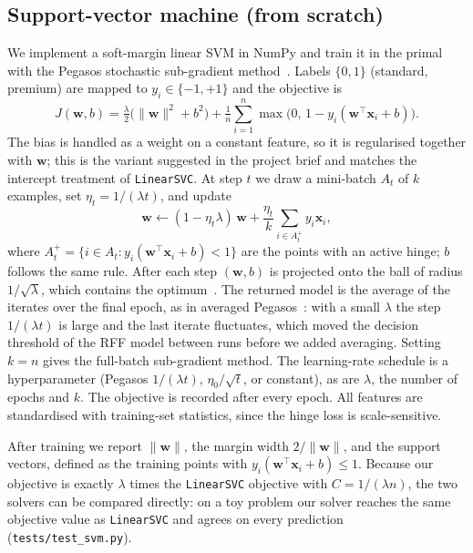 \subsection{Support-vector machine (from scratch)}
We implement a soft-margin linear SVM in NumPy and train it in the
primal with the Pegasos stochastic sub-gradient method~\cite{pegasos}.
Labels $\{0,1\}$ (standard, premium) are mapped to $y_i\in\{-1,+1\}$ and
the objective is
\begin{equation}
  J(\mathbf{w},b)=\tfrac{\lambda}{2}\big(\lVert\mathbf{w}\rVert^{2}+b^{2}\big)
  +\tfrac{1}{n}\sum_{i=1}^{n}\max\!\big(0,\,1-y_i(\mathbf{w}^{\top}\mathbf{x}_i+b)\big).
\end{equation}
The bias is handled as a weight on a constant feature, so it is
regularised together with $\mathbf{w}$; this is the variant suggested
in the project brief and matches the intercept treatment of
\texttt{LinearSVC}. At step $t$ we draw a mini-batch $A_t$ of $k$
examples, set $\eta_t=1/(\lambda t)$, and update
\begin{equation}
  \mathbf{w}\leftarrow(1-\eta_t\lambda)\,\mathbf{w}
  +\frac{\eta_t}{k}\sum_{i\in A_t^{+}}y_i\mathbf{x}_i ,
\end{equation}
where $A_t^{+}=\{i\in A_t: y_i(\mathbf{w}^{\top}\mathbf{x}_i+b)<1\}$ are
the points with an active hinge; $b$ follows the same rule. After each
step $(\mathbf{w},b)$ is projected onto the ball of radius
$1/\sqrt{\lambda}$, which contains the optimum~\cite{pegasos}. The
returned model is the average of the iterates over the final epoch, as in
averaged Pegasos~\cite{pegasos}: with a small $\lambda$ the step
$1/(\lambda t)$ is large and the last iterate fluctuates, which moved the
decision threshold of the RFF model between runs before we added
averaging. Setting
$k=n$ gives the full-batch sub-gradient method. The learning-rate
schedule is a hyperparameter (Pegasos $1/(\lambda t)$, $\eta_0/\sqrt{t}$,
or constant), as are $\lambda$, the number of epochs and $k$. The
objective is recorded after every epoch. All features are standardised
with training-set statistics, since the hinge loss is scale-sensitive.

After training we report $\lVert\mathbf{w}\rVert$, the margin width
$2/\lVert\mathbf{w}\rVert$, and the support vectors, defined as the
training points with $y_i(\mathbf{w}^{\top}\mathbf{x}_i+b)\le 1$.
Because our objective is exactly $\lambda$ times the
\texttt{LinearSVC} objective with $C=1/(\lambda n)$, the two solvers can
be compared directly: on a toy problem our solver reaches the same
objective value as \texttt{LinearSVC} and agrees on every prediction
(\texttt{tests/test\_svm.py}).

